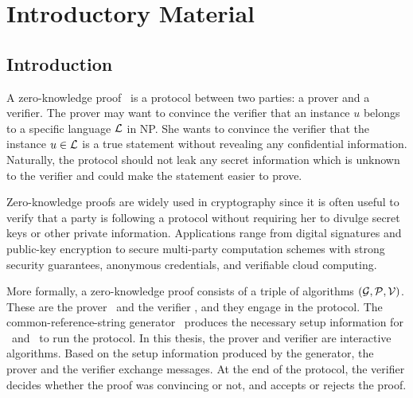 \chapter{Introductory Material}
\label{chapterlabel:Introduction}


\section{Introduction}

A zero-knowledge proof~\cite{GoldwasserMR85} is a protocol between two parties: a prover and a verifier. The prover may want to convince the verifier that an instance $u$ belongs to a specific language $\mathcal{L}$ in NP. She wants to convince the verifier that the instance $u\in \mathcal{L}$ is a true statement without revealing any confidential information. Naturally, the protocol should not leak any secret information which is unknown to the verifier and could make the statement easier to prove.

Zero-knowledge proofs are widely used in cryptography since it is often useful to verify that a party is following a protocol without requiring her to divulge secret keys or other private information. Applications range from digital signatures and public-key encryption to secure multi-party computation schemes with strong security guarantees, anonymous credentials, and verifiable cloud computing.

More formally, a zero-knowledge proof consists of a triple of algorithms $(\mathcal{G},\mathcal{P},\mathcal{V})$. These are the prover \prover\ and the verifier \verifier, and they engage in the protocol. The common-reference-string generator \crsgen\ produces the necessary setup information for \prover\ and \verifier\ to run the protocol. In this thesis, the prover and verifier are interactive algorithms. Based on the setup information produced by the generator, the prover and the verifier exchange messages. At the end of the protocol, the verifier decides whether the proof was convincing or not, and accepts or rejects the proof.

